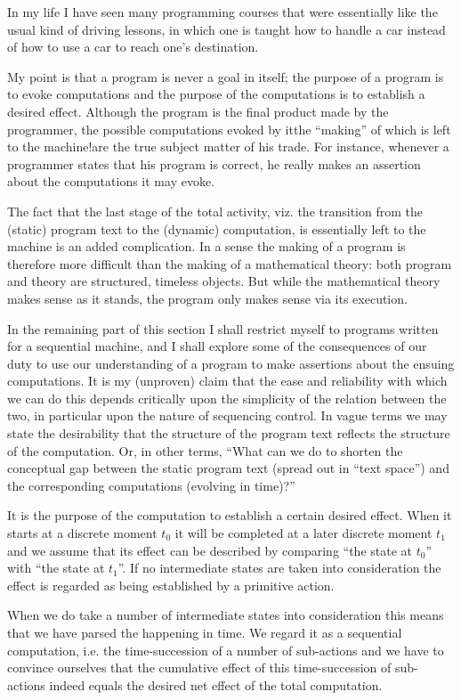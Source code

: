 \documentclass[twoside,11pt]{book}
\begin{document}
In my life I have seen many programming courses that were essentially like the usual kind of driving lessons, in which one is taught how to handle a car
instead of how to use a car to reach one's destination.

My point is that a program is never a goal in itself; the purpose of a program is to evoke computations and the purpose of the computations is to establish a desired effect. Although the program is the final product made by the programmer, the possible computations evoked by it\textemdash{}the ``making'' of which is left to the machine!\textemdash{}are the true subject matter of his trade. For instance, whenever a programmer states that his program is correct, he really makes an assertion about the computations it may evoke.

The fact that the last stage of the total activity, viz. the transition from the (static) program text to the (dynamic) computation, is essentially left to the machine is an added complication. In a sense the making of a program is therefore more difficult than the making of a mathematical theory: both program and theory are structured, timeless objects. But while the mathematical theory makes sense as it stands, the program only makes sense via its execution.

In the remaining part of this section I shall restrict myself to programs written for a sequential machine, and I shall explore some of the consequences of our duty to use our understanding of a program to make assertions about the ensuing computations. It is my (unproven) claim that the ease and reliability with which we can do this depends critically upon the simplicity of the relation between the two, in particular upon the nature of sequencing control. In vague terms we may state the desirability that the structure of the program text reflects the structure of the computation. Or, in other terms, ``What can we do to shorten the conceptual gap between the static program
text (spread out in ``text space'') and the corresponding computations (evolving in time)?''

It is the purpose of the computation to establish a certain desired effect. When it starts at a discrete moment $t_0$ it will be completed at a later discrete moment $t_1$ and we assume that its effect can be described by comparing ``the state at $t_0$'' with ``the state at $t_1$''. If no intermediate states are taken into consideration the effect is regarded as being established by a primitive action.

When we do take a number of intermediate states into consideration this means that we have parsed the happening in time. We regard it as a sequential computation, i.e. the time-succession of a number of sub-actions and we have to convince ourselves that the cumulative effect of this time-succession of sub-actions indeed equals the desired net effect of the total computation.
\end{document}
